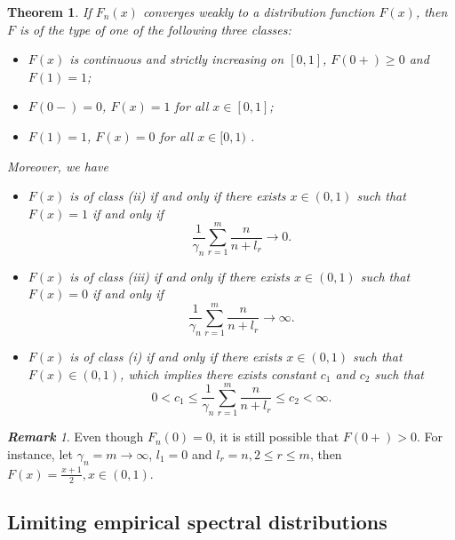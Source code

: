 \documentclass[12pt]{article}
\theoremstyle{plain}
\newtheorem{thm}{\textbf{Theorem}}
\theoremstyle{definition}
\theoremstyle{remark}
\newtheorem{rem}{\textbf{Remark}}
\begin{document}
\begin{thm}\label{thm:classification}
    If $F_n(x)$ converges weakly to a distribution function $F(x)$, then $F$ is of the type of one of the following three classes:
    \begin{itemize}
    \item[(i).] $F(x)$ is continuous and strictly increasing on $[0,1]$, $F(0+)\geq0$ and
    $F(1)=1$;

    \item[(ii).] $F(0-)=0$, $F(x)=1$ for all $x\in [0,1]$;

    \item[(iii).] $F(1)=1$, $F(x)=0$ for all $x\in [0,1)$ .
    \end{itemize}
    Moreover,  we have
\begin{itemize}
\item[(a).] $F(x)$ is of class (ii) if and only if there exists $x\in
(0,1)$ such that $F(x)=1$ if and only if
    \begin{equation*}
    \frac{1}{\gamma_{n}} \sum_{r=1}^{m} \frac{n}{n+l_{r}} \rightarrow 0.
    \end{equation*}
\item[(b).]
    $F(x)$ is of class (iii) if and only if there exists $x\in (0,1)$ such that $F(x)=0$ if and only if
    \begin{equation*}
    \frac{1}{\gamma_{n}} \sum_{r=1}^{m} \frac{n}{n+l_{r}} \rightarrow
    \infty.
    \end{equation*}
\item[(c).]
    $F(x)$ is of class (i) if and only if there exists $x\in (0,1)$ such that $F(x)\in (0,1)$, which implies
    there exists constant $c_1$ and $c_2$ such that
    \begin{equation}
    0<c_{1} \leqslant \frac{1}{\gamma_{n}} \sum_{r=1}^{m} \frac{n}{n+l_{r}} \leqslant c_{2}<\infty.
    \end{equation}
\end{itemize}
\end{thm}


\begin{rem}\label{stange}
    Even though $F_n(0)=0$, it is still possible that $F(0+)>0$. For instance, let $\gamma_{n}=m\to \infty$, $ l_1=0$ and $l_r=n,2\leq r\leq m$, then $F(x)=\frac{x+1}{2}, x\in (0,1)$.
\end{rem}


\subsection{Limiting empirical spectral distributions}
\end{document}
